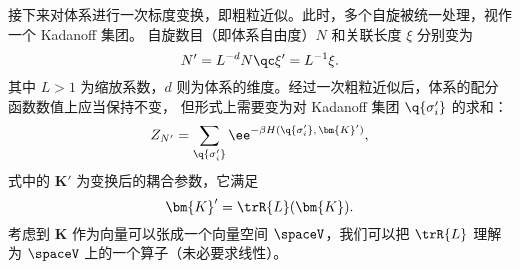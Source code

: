 接下来对体系进行一次标度变换，即粗粒近似。此时，多个自旋被统一处理，视作一个 Kadanoff 集团。
自旋数目（即体系自由度）$N$ 和关联长度 $\xi$ 分别变为
\begin{equation}
  \label{eq:N-xi-renormalization}
  N' = L^{-d} N \qc \xi' = L^{-1} \xi.
\end{equation}
其中 $L>1$ 为缩放系数，$d$ 则为体系的维度。经过一次粗粒近似后，体系的配分函数数值上应当保持不变，
但形式上需要变为对 Kadanoff 集团 $\q{\sigma_i'}$ 的求和：
\begin{equation}
  Z_{N'} = \sum_\q{\sigma'_i} \ee^{-\beta H(\q{\sigma_i'},\,\bm{K}')},
\end{equation}
式中的 $\bm{K}'$ 为变换后的耦合参数，它满足
\begin{equation}
  \label{eq:K-renormalization}
  \bm{K}' = \trR{L}(\bm{K}).
\end{equation}
考虑到 $\bm{K}$ 作为向量可以张成一个向量空间 $\spaceV$，我们可以把 $\trR{L}$ 理解为 $\spaceV$
上的一个算子（未必要求线性）。


